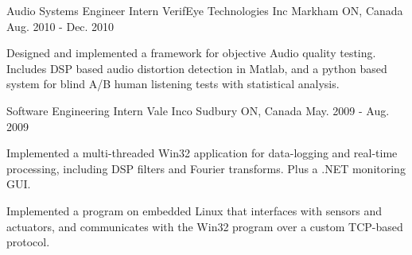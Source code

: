 \begin{cventries}
  \cventry
    {Audio Systems Engineer Intern} %
    {VerifEye Technologies Inc} %
    {Markham ON, Canada} %
    {Aug. 2010 - Dec. 2010} %
    {
      \begin{cvitems} %
		\item {Designed and implemented a framework for objective Audio quality testing. Includes DSP based audio distortion detection in Matlab, and a python based system for blind A/B human listening tests with statistical analysis.}
      \end{cvitems}
    }
	
  \cventry
    {Software Engineering Intern} %
    {Vale Inco} %
    {Sudbury ON, Canada} %
    {May. 2009 - Aug. 2009} %
    {
      \begin{cvitems} %
		\item {Implemented a multi-threaded Win32 application for data-logging and real-time processing, including DSP filters and Fourier transforms. Plus a .NET monitoring GUI.}
        \item {Implemented a program on embedded Linux that interfaces with sensors and actuators, and communicates with the Win32 program over a custom TCP-based protocol.}
      \end{cvitems}
    }

\end{cventries}
